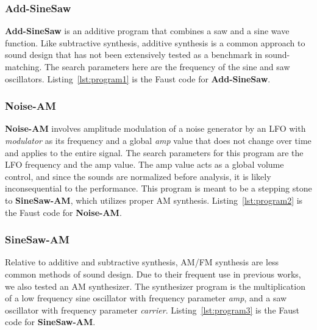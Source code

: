 \documentclass[lettersize,journal]{IEEEtran}
\newcommand{\AddSineSaw}{\textbf{Add-SineSaw}}
\newcommand{\AmpMod}{\textbf{Noise-AM}}
\newcommand{\FMMod}{\textbf{SineSaw-AM}}
\begin{document}
\subsubsection{\AddSineSaw}
\label{sec:program1}
\AddSineSaw{} is an additive program that combines a saw and a sine wave function. Like subtractive synthesis, additive synthesis is a common approach to sound design that has not been extensively tested as a benchmark in sound-matching. The search parameters here are the frequency of the sine and saw oscillators. Listing~\ref{lst:program1} is the Faust code for \AddSineSaw.

\subsubsection{\AmpMod}
\label{sec:program2}
\AmpMod{} involves amplitude modulation of a noise generator by an LFO with \textit{modulator} as its frequency and a global \textit{amp} value that does not change over time and applies to the entire signal. The search parameters for this program are the LFO frequency and the amp value. The amp value acts as a global volume control, and since the sounds are normalized before analysis, it is likely inconsequential to the performance. This program is meant to be a stepping stone to \FMMod, which utilizes proper AM synthesis. Listing~\ref{lst:program2} is the Faust code for \AmpMod. 

\subsubsection{\FMMod}
\label{sec:program3}
Relative to additive and subtractive synthesis, AM/FM synthesis are less common methods of sound design. Due to their frequent use in previous works, we also tested an AM synthesizer. The synthesizer program is the multiplication of a low frequency sine oscillator with frequency parameter \textit{amp}, and a saw oscillator with frequency parameter \textit{carrier}. Listing~\ref{lst:program3} is the Faust code for \FMMod. 
\end{document}
